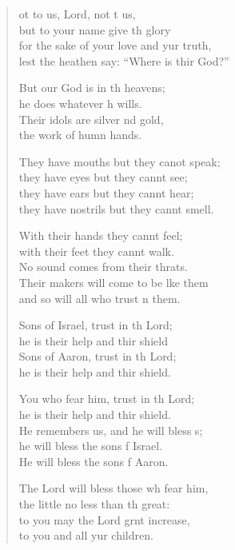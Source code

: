 \begin{verse}
  \begin{patverse}
ot to us, Lord, not t us,\Med\\
but to your name give th glory\\
for the sake of your love and yur truth,\Med\\
lest the heathen say: “Where is thir God?”

But our God is in th heavens;\Med\\
he does whatever h wills.\\
Their idols are silver nd gold,\Med\\
the work of humn hands.

They have mouths but they canot speak;\Med\\
they have eyes but they cannt see;\\
they have ears but they cannt hear;\Med\\
they have nostrils but they cannt smell.

With their hands they cannt feel;\Flex\\
with their feet they cannt walk.\Med\\
No sound comes from their thrats.\\
Their makers will come to be l\pointup{\i}ke them\Med\\
and so will all who trust \pointup{\i}n them.

Sons of Israel, trust in th Lord;\Med\\
he is their help and thir shield\\
Sons of Aaron, trust in th Lord;\Med\\
he is their help and thir shield.

You who fear him, trust in th Lord;\Med\\
he is their help and thir shield.\\
He remembers us, and he will bless s;\Flex\\
he will bless the sons f Israel.\Med\\
He will bless the sons f Aaron.

The Lord will bless those wh fear him,\Med\\
the little no less than th great:\\
to you may the Lord grnt increase,\Med\\
to you and all yur children.


\end{patverse}
\end{verse}
